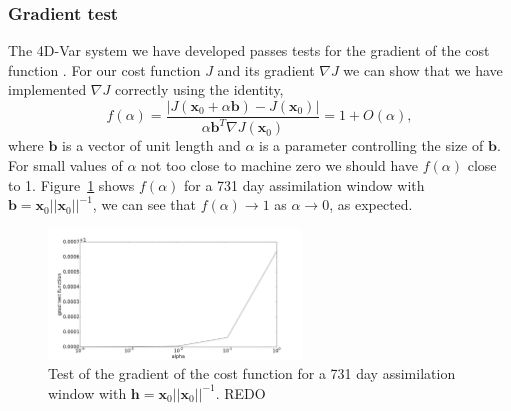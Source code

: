 \documentclass[11pt]{article}
\begin{document}
\subsubsection{Gradient test} \label{sec:testgrad}

The 4D-Var system we have developed passes tests for the gradient of the cost function \citep{Navon1992}. For our cost function $J$ and its gradient $\nabla J$ we can show that we have implemented $\nabla J$ correctly using the identity,
\begin{equation}
f(\alpha)=\frac{| J( \textbf{x}_0 + \alpha \textbf{b}) - J(\textbf{x}_0) |}{\alpha \textbf{b}^{T} \nabla J(\textbf{x}_0)} = 1 + O(\alpha),
\end{equation}
where $\textbf{b}$ is a vector of unit length and $\alpha$ is a parameter controlling the size of $\textbf{b}$. For small values of $\alpha$ not too close to machine zero we should have $f(\alpha)$ close to 1. Figure~\ref{fig:testgradcostone} shows $f(\alpha)$ for a 731 day assimilation window with $\textbf{b}=\textbf{x}_0||\textbf{x}_0||^{-1}$, we can see that $f(\alpha) \rightarrow 1$ as $\alpha \rightarrow 0$, as expected.

\begin{figure}[ht]
    \centering
    \includegraphics[width=0.6\textwidth]{gradtestone.png}
    \caption{Test of the gradient of the cost function for a 731 day assimilation window with $\textbf{h}=\textbf{x}_0||\textbf{x}_0||^{-1}$. {\color{red}REDO}}
    \label{fig:testgradcostone}
\end{figure}
\end{document}
